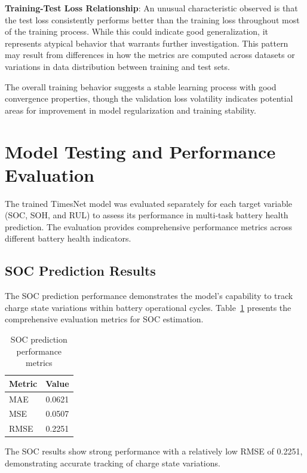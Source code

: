 \textbf{Training-Test Loss Relationship}: An unusual characteristic observed is that the test loss consistently performs better than the training loss throughout most of the training process. While this could indicate good generalization, it represents atypical behavior that warrants further investigation. This pattern may result from differences in how the metrics are computed across datasets or variations in data distribution between training and test sets.

The overall training behavior suggests a stable learning process with good convergence properties, though the validation loss volatility indicates potential areas for improvement in model regularization and training stability.

\section{Model Testing and Performance Evaluation}
\label{sec:model_testing}

The trained TimesNet model was evaluated separately for each target variable (SOC, SOH, and RUL) to assess its performance in multi-task battery health prediction. The evaluation provides comprehensive performance metrics across different battery health indicators.

\subsection{SOC Prediction Results}
\label{subsec:soc_results}

The SOC prediction performance demonstrates the model's capability to track charge state variations within battery operational cycles. Table~\ref{tab:soc_results} presents the comprehensive evaluation metrics for SOC estimation.

\begin{table}[htbp]
\centering
\caption{SOC prediction performance metrics}
\label{tab:soc_results}
\begin{tabular}{lc}
\hline
\textbf{Metric} & \textbf{Value} \\
\hline
MAE & 0.0621 \\
MSE & 0.0507 \\
RMSE & 0.2251 \\
\hline
\end{tabular}
\end{table}

The SOC results show strong performance with a relatively low RMSE of 0.2251, demonstrating accurate tracking of charge state variations.

